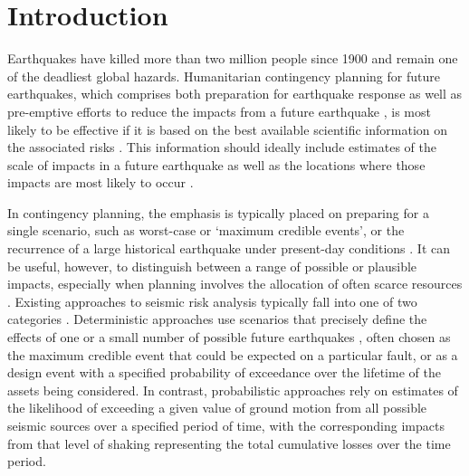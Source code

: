 \documentclass[preprint,12pt,authoryear]{elsarticle}
\begin{document}
\section{Introduction}
Earthquakes have killed more than two million people since 1900 \citep{England2011,Daniell2017} and remain one of the deadliest global hazards. Humanitarian contingency planning for future earthquakes, which comprises both preparation for earthquake response as well as pre-emptive efforts to reduce the impacts from a future earthquake \citep{IASC2007,IFRC2012}, is most likely to be effective if it is based on the best available scientific information on the associated risks \citep{Alexander2007}. This information should ideally include estimates of the scale of impacts in a future earthquake as well as the locations where those impacts are most likely to occur \citep{IASC2007}.

In contingency planning, the emphasis is typically placed on preparing for a single scenario, such as worst-case or `maximum credible events', or the recurrence of a large historical earthquake under present-day conditions \citep[e.g.,][]{klugel_seismic_2008}. It can be useful, however, to distinguish between a range of possible or plausible impacts, especially when planning involves the allocation of often scarce resources \citep{Robinson2018}. Existing approaches to seismic risk analysis typically fall into one of two categories \citep{Robinson2018, mcguire_deterministic_2001}. Deterministic approaches use scenarios that precisely define the effects of one or a small number of possible future earthquakes \citep{Davies2015}, often chosen as the maximum credible event that could be expected on a particular fault, or as a design event with a specified probability of exceedance over the lifetime of the assets being considered. In contrast, probabilistic approaches rely on estimates of the likelihood of exceeding a given value of ground motion from all possible seismic sources over a specified period of time, with the corresponding impacts from that level of shaking representing the total cumulative losses over the time period.
\end{document}
